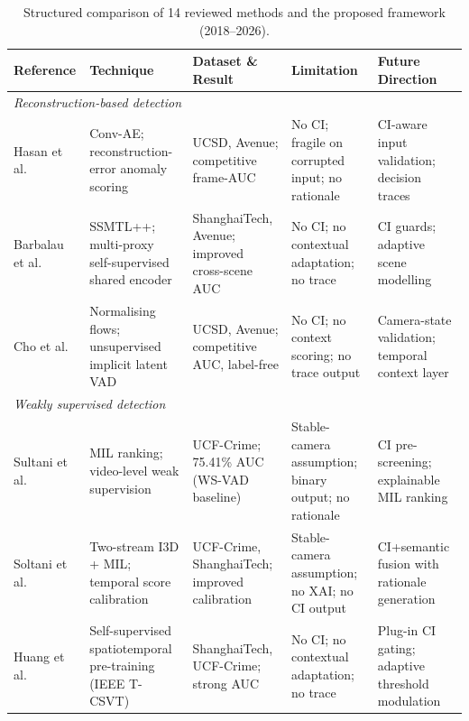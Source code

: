\documentclass[sensors,article,submit,pdftex,moreauthors]{Definitions/mdpi}
\begin{document}
\begin{table}[H]
\caption{Structured comparison of 14 reviewed methods and the proposed framework (2018--2026).}
\label{tab:relatedwork}
\centering
\scriptsize
\setlength{\tabcolsep}{3pt}
\renewcommand{\arraystretch}{1.22}
\begin{tabularx}{\linewidth}{p{1.8cm} p{3.2cm} p{2.6cm} p{2.6cm} p{2.6cm}}
\toprule
\textbf{Reference} &
\textbf{Technique} &
\textbf{Dataset \& Result} &
\textbf{Limitation} &
\textbf{Future Direction} \\
\midrule
 
\multicolumn{5}{l}{\textit{Reconstruction-based detection}} \\[1pt]
 
Hasan et al.~\cite{hasan2016anomaly}
  & Conv-AE; reconstruction-error anomaly scoring
  & UCSD, Avenue; competitive frame-AUC
  & No CI; fragile on corrupted input; no rationale
  & CI-aware input validation; decision traces \\
 
Barbalau et al.~\cite{barbalau2023ssmtl}
  & SSMTL++; multi-proxy self-supervised shared encoder
  & ShanghaiTech, Avenue; improved cross-scene AUC
  & No CI; no contextual adaptation; no trace
  & CI guards; adaptive scene modelling \\
 
Cho et al.~\cite{cho2023lookonce}
  & Normalising flows; unsupervised implicit latent VAD
  & UCSD, Avenue; competitive AUC, label-free
  & No CI; no context scoring; no trace output
  & Camera-state validation; temporal context layer \\[3pt]
 
\multicolumn{5}{l}{\textit{Weakly supervised detection}} \\[1pt]
 
Sultani et al.~\cite{sultani2018realworld}
  & MIL ranking; video-level weak supervision
  & UCF-Crime; 75.41\% AUC (WS-VAD baseline)
  & Stable-camera assumption; binary output; no rationale
  & CI pre-screening; explainable MIL ranking \\
 
Soltani et al.~\cite{soltani2024i3dAnomaly}
  & Two-stream I3D + MIL; temporal score calibration
  & UCF-Crime, ShanghaiTech; improved calibration
  & Stable-camera assumption; no XAI; no CI output
  & CI+semantic fusion with rationale generation \\
 
Huang et al.~\cite{huang2024selfsupervised}
  & Self-supervised spatiotemporal pre-training (IEEE T-CSVT)
  & ShanghaiTech, UCF-Crime; strong AUC
  & No CI; no contextual adaptation; no trace
  & Plug-in CI gating; adaptive threshold modulation \\[3pt]
 

\end{tabularx}
\end{table}
\end{document}
